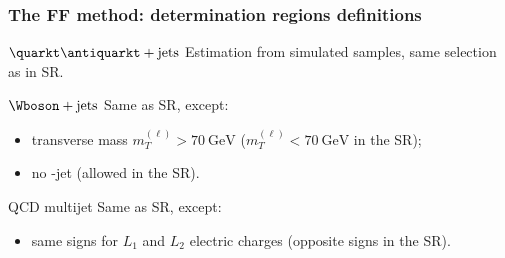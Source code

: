 %

\begin{frame}
\frametitle{The FF method: determination regions definitions}

\begin{block}{$\quarkt\antiquarkt+\text{jets}$}
Estimation from simulated samples, same selection as in SR.
\end{block}

\pause\vfill

\begin{block}{$\Wboson+\text{jets}$}
Same as SR, except:
\begin{itemize}
\item transverse mass $m_T^{(\ell)}>\SI{70}{\GeV}$ ($m_T^{(\ell)}<\SI{70}{\GeV}$ in the SR);
\item no \quarkb-jet (allowed in the SR).
\end{itemize}
\end{block}

\pause\vfill

\begin{block}{QCD multijet}
Same as SR, except:
\begin{itemize}
\item same signs for $L_1$ and $L_2$ electric charges (opposite signs in the SR).
\end{itemize}
\end{block}

\vfill
\end{frame}

